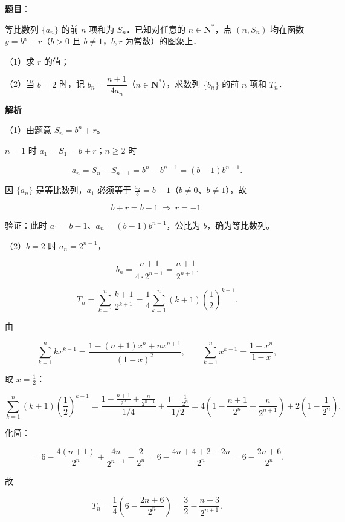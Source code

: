 \begin{answer}

\textbf{题目}：

等比数列 $\{a_n\}$ 的前 $n$ 项和为 $S_n$．已知对任意的 $n\in\mathbf N^*$，点 $(n,S_n)$ 均在函数 $y=b^x+r$（$b>0$ 且 $b\neq1$，$b,r$ 为常数）的图象上．

（1）求 $r$ 的值；

（2）当 $b=2$ 时，记 $b_n=\dfrac{n+1}{4a_n}$（$n\in\mathbf N^*$），求数列 $\{b_n\}$ 的前 $n$ 项和 $T_n$．

\textbf{解析}

（1）由题意 $S_n=b^n+r$。

$n=1$ 时 $a_1=S_1=b+r$；$n\geqslant2$ 时

\nopagebreak[4]
\[a_n=S_n-S_{n-1}=b^n-b^{n-1}=(b-1)b^{n-1}.\]

因 $\{a_n\}$ 是等比数列，$a_1$ 必须等于 $\frac{a_2}{b}=b-1$（$b\neq0$、$b\neq1$），故

\nopagebreak[4]
\[b+r=b-1\ \Longrightarrow\ r=-1 .\]

验证：此时 $a_1=b-1$、$a_n=(b-1)b^{n-1}$，公比为 $b$，确为等比数列。

（2）$b=2$ 时 $a_n=2^{n-1}$，

\nopagebreak[4]
\[b_n=\frac{n+1}{4\cdot2^{n-1}}=\frac{n+1}{2^{n+1}} .\]

\nopagebreak[4]
\[T_n=\sum_{k=1}^{n}\frac{k+1}{2^{k+1}}=\frac14\sum_{k=1}^{n}(k+1)\left(\frac12\right)^{k-1}.\]

由

\nopagebreak[4]
\[\sum_{k=1}^{n}k x^{k-1}=\frac{1-(n+1)x^n+nx^{n+1}}{(1-x)^2},\qquad
\sum_{k=1}^{n}x^{k-1}=\frac{1-x^n}{1-x},\]

取 $x=\frac12$：

\nopagebreak[4]
\[\sum_{k=1}^{n}(k+1)\left(\frac12\right)^{k-1}
=\frac{1-\frac{n+1}{2^n}+\frac{n}{2^{n+1}}}{1/4}+\frac{1-\frac1{2^n}}{1/2}
=4\left(1-\frac{n+1}{2^n}+\frac{n}{2^{n+1}}\right)+2\left(1-\frac1{2^n}\right).\]

化简：

\nopagebreak[4]
\[=6-\frac{4(n+1)}{2^n}+\frac{4n}{2^{n+1}}-\frac{2}{2^n}
=6-\frac{4n+4+2-2n}{2^n}=6-\frac{2n+6}{2^n}.\]

故

\nopagebreak[4]
\[T_n=\frac14\left(6-\frac{2n+6}{2^n}\right)=\frac32-\frac{n+3}{2^{n+1}} .\]


\end{answer}
